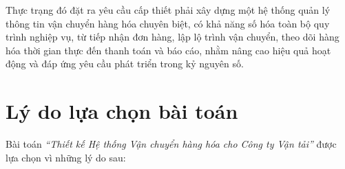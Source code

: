 \documentclass[11pt]{report}
\begin{document}
Thực trạng đó đặt ra yêu cầu cấp thiết phải xây dựng một hệ thống quản lý thông tin vận chuyển hàng hóa chuyên biệt, có khả năng số hóa toàn bộ quy trình nghiệp vụ, từ tiếp nhận đơn hàng, lập lộ trình vận chuyển, theo dõi hàng hóa thời gian thực đến thanh toán và báo cáo, nhằm nâng cao hiệu quả hoạt động và đáp ứng yêu cầu phát triển trong kỷ nguyên số.


\section{Lý do lựa chọn bài toán}
\label{sec:lydo}

Bài toán \textit{``Thiết kế Hệ thống Vận chuyển hàng hóa cho Công ty Vận tải''} được lựa chọn vì những lý do sau:
\end{document}
